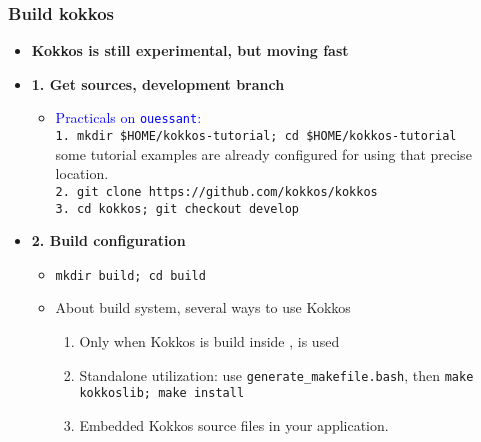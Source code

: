 \begin{frame}
  \frametitle{Build kokkos}

  \begin{itemize}
  \item \textbf{Kokkos is still experimental, but moving fast}
  \item \textbf{1. Get sources, development branch}
    \begin{itemize}
    \item \textcolor{blue}{Practicals on \texttt{ouessant}:}\\
      \texttt{1. mkdir \$HOME/kokkos-tutorial; cd \$HOME/kokkos-tutorial}\\
      some tutorial examples are already configured for using that precise location.\\
      \texttt{2. git clone https://github.com/kokkos/kokkos}\\
      \texttt{3. cd kokkos; git checkout develop}
    \end{itemize}
  \item \textbf{2. Build configuration}
    \begin{itemize}
    \item \texttt{mkdir build; cd build}
    \item About build system, several ways to use Kokkos
      \begin{enumerate}
      \item Only when Kokkos is build inside ,  is used
      \item Standalone utilization: use \texttt{generate\_makefile.bash}, then \texttt{make kokkoslib; make install}
      \item Embedded Kokkos source files in your application.
      \end{enumerate}
    \end{itemize}
  \end{itemize}
 
\end{frame}

